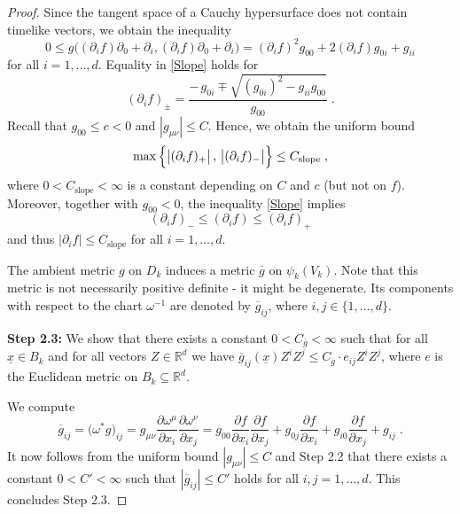\documentclass[reqno]{article}
\newcommand{\R}{\mathbb{R}}
\newcommand{\ux}{\underline{x}}
\begin{document}
\begin{proof}
Since the tangent space of a Cauchy hypersurface does not contain timelike vectors, we obtain the inequality
\begin{equation}
\label{Slope}
0 \leq g\Big((\partial_i f) \partial_0 + \partial_i, (\partial_i f) \partial_0 + \partial_i\Big) = (\partial_i f)^2 g_{00} + 2 (\partial_i f) g_{0i} + g_{ii} 
\end{equation}
for all $i = 1, \ldots, d$.
Equality in \eqref{Slope} holds for  
\begin{equation*}
(\partial_i f)_\pm =  \frac{-\,g_{0i} \mp \sqrt{(g_{0i})^2 - g_{ii} g_{00}}}{g_{00}} \;.
\end{equation*}
Recall that $g_{00} \leq c  < 0$ and $|g_{\mu \nu}| \leq C$. Hence, we obtain the uniform bound
\begin{equation*}
\max\Big{\{}\big{|}(\partial_i f)_+\big{|} \, , \,\big{|} (\partial_i f)_-\big{|} \Big{\}} \leq C_\mathrm{slope}  \;,
\end{equation*}
where $0< C_\mathrm{slope}  < \infty$ is a constant depending on $C$ and $c$ (but not on $f$).
Moreover, together with $g_{00} <0$, the inequality \eqref{Slope} implies
\begin{equation*}
(\partial_i f)_- \leq (\partial_i f) \leq (\partial_i f)_+ 
\end{equation*}
and thus $|\partial_i f| \leq C_\mathrm{slope} $ for all $i = 1, \ldots, d$.
\vspace*{2mm}

The ambient metric $g$ on $D_k$ induces a metric $\overline{g}$ on $\psi_k(V_k)$.
Note that this metric is not necessarily positive definite - it might be degenerate. Its components with respect to the chart $\omega^{-1} $ are denoted by $\overline{g}_{ij}$, where $i,j \in \{1, \ldots, d\}$.
\vspace*{2mm}

\textbf{Step 2.3:} We show that there exists a constant $0 < C_{\overline{g}} < \infty$ such that for all  $\ux \in B_k$ and for all vectors $Z \in \R^d$ we have $\overline{g}_{ij}(\ux) Z^i Z^j \leq C_{\overline{g}} \cdot e_{ij}Z^i Z^j$, where $e$ is the Euclidean metric on $B_k \subseteq \R^d$.
\vspace*{2mm}

We compute
\begin{equation*}
\overline{g}_{ij} = \big(\omega^*g\big)_{ij} = g_{\mu \nu} \frac{\partial \omega^\mu}{\partial x_i} \frac{\partial \omega^\nu}{\partial x_j} = g_{00} \frac{\partial f}{\partial x_i} \frac{\partial f}{\partial x_j} + g_{0j}\frac{\partial f}{\partial x_i} + g_{i0}\frac{\partial f}{\partial x_j} + g_{ij} \;.
\end{equation*}
It now follows from the uniform bound $|g_{\mu \nu}| \leq C$ and Step 2.2 that there exists a constant $0 < C' < \infty$ such that $|\overline{g}_{ij}| \leq C'$ holds for all  $i,j = 1, \ldots, d$. This concludes Step 2.3.
\vspace*{2mm}


\end{proof}
\end{document}
